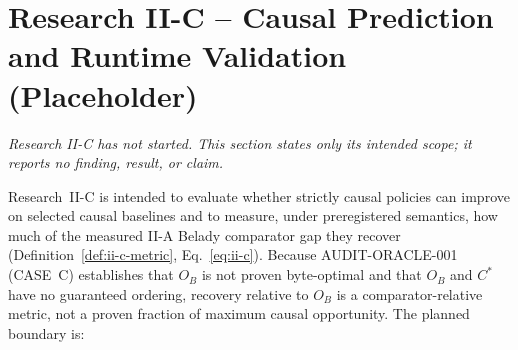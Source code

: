 \section{Research II-C -- Causal Prediction and Runtime Validation (Placeholder)}
\label{sec:iic-placeholder}

\textit{Research II-C has not started. This section states only its
intended scope; it reports no finding, result, or claim.}

Research~II-C is intended to evaluate whether strictly causal policies can
improve on selected causal baselines and to measure, under preregistered
semantics, how much of the measured II-A Belady comparator gap they recover
(Definition~\ref{def:ii-c-metric}, Eq.~\ref{eq:ii-c}). Because
\textsc{AUDIT-ORACLE-001} (CASE~C) establishes that $O_B$ is not proven
byte-optimal and that $O_B$ and $C^*$ have no guaranteed ordering,
recovery relative to $O_B$ is a comparator-relative metric, not a proven
fraction of maximum causal opportunity. The planned boundary is:

